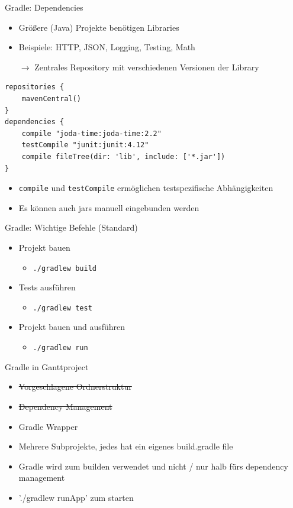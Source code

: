 \documentclass{beamer}
\begin{document}
\begin{frame}[fragile]{Gradle: Dependencies}
	\begin{itemize}
		\item Größere (Java) Projekte benötigen Libraries
		\item Beispiele: HTTP, JSON, Logging, Testing, Math
		\item[$\rightarrow$] Zentrales Repository mit verschiedenen Versionen der Library
	\end{itemize}
\begin{lstlisting}
repositories {
    mavenCentral()
}
dependencies {
    compile "joda-time:joda-time:2.2"
    testCompile "junit:junit:4.12"
    compile fileTree(dir: 'lib', include: ['*.jar'])  
}
\end{lstlisting}
\begin{itemize}
	\item \texttt{compile} und \texttt{testCompile} ermöglichen testspezifische Abhängigkeiten
	\item Es können auch jars manuell eingebunden werden
\end{itemize}
\end{frame}

\begin{frame}{Gradle: Wichtige Befehle (Standard)}
	\begin{itemize}
		\item Projekt bauen
		\begin{itemize}
			\item \texttt{./gradlew build}
		\end{itemize}
		\item Tests ausführen
		\begin{itemize}
			\item \texttt{./gradlew test}
		\end{itemize}
		\item Projekt bauen und ausführen
		\begin{itemize}
			\item \texttt{./gradlew run}
		\end{itemize}
	\end{itemize}
\end{frame}

\begin{frame}{Gradle in Ganttproject}
	\begin{itemize}
		\item \sout{Vorgeschlagene Ordnerstruktur}
		\item \sout{Dependency Management}
		\item Gradle Wrapper
		\item Mehrere Subprojekte, jedes hat ein eigenes build.gradle file
		\item Gradle wird zum builden verwendet und nicht / nur halb fürs dependency management
		\item './gradlew runApp' zum starten
	\end{itemize}
\end{frame}
\end{document}
